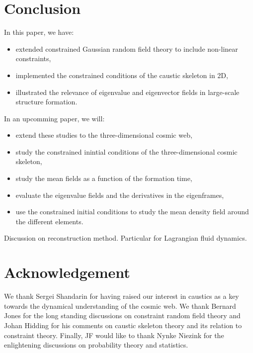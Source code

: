 \documentclass[a4paper, 11pt]{article}
\begin{document}
\section{Conclusion}\label{sec:conclusion}
In this paper, we have:
\begin{itemize}
\item extended constrained Gaussian random field theory to include non-linear constraints,
\item implemented the constrained conditions of the caustic skeleton in 2D,
\item illustrated the relevance of eigenvalue and eigenvector fields in large-scale structure formation.
\end{itemize}
In an upcomming paper, we will:
\begin{itemize}
\item extend these studies to the three-dimensional cosmic web,
\item study the constrained inintial conditions of the three-dimensional cosmic skeleton,
\item study the mean fields as a function of the formation time,
\item evaluate the eigenvalue fields and the derivatives in the eigenframes,
\item use the constrained initial conditions to study the mean density field around the different elements.
\end{itemize}

\begin{framed}
Discussion on reconstruction method. Particular for Lagrangian fluid dynamics.
\end{framed}

\section*{Acknowledgement}
We thank Sergei Shandarin for having raised our interest in caustics as a key towards the dynamical understanding of the cosmic web. We thank Bernard Jones for the long standing discussions on constraint random field theory and Johan Hidding for his comments on caustic skeleton theory and its relation to constraint theory. Finally, JF would like to thank Nynke Niezink for the enlightening discussions on probability theory and statistics. 

\end{document}
